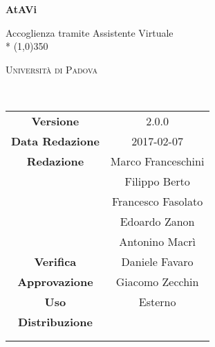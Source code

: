 \documentclass[a4paper,12pt]{article}
\date{2016-12-20}
\begin{document}
	\begin{titlepage}
		\centering
		{\huge\bfseries AtAVi\par}
		Accoglienza tramite Assistente Virtuale \\*
		\line(1,0){350} \\
		{\scshape\LARGE Università di Padova \par}
		\vspace{1cm}
		{\scshape\Large \analisideirequisitii\ \par}
		\logo
		\newpage
		\begin{tabular}{c|c}
			{\hfill \textbf{Versione}} 			& 2.0.0						\\ 
			{\hfill\textbf{Data Redazione}} 	& 2017-02-07 		\\ 
			{\hfill\textbf{Redazione}} 			& Marco Franceschini \\ & Filippo Berto \\ & Francesco Fasolato 	\\ & Edoardo Zanon \\ & Antonino Macrì		\\ 
			{\hfill\textbf{Verifica}} 			& Daniele Favaro \\ 
			{\hfill\textbf{Approvazione}} 		& Giacomo Zecchin		\\
			{\hfill\textbf{Uso}} 				& Esterno 				\\
			{\hfill\textbf{Distribuzione}} 		& \vardanega \\ & \cardin \\ & \prop \\
		\end{tabular}
	\end{titlepage}
	
	\pagestyle{myfront}
	\newpage
	
	\newpage
	\tableofcontents
	\newpage
	\listoftables
	\newpage
	\listoffigures
	
	\label{LastFrontPage}	
	\newpage	
	\pagestyle{mymain}
				
	\newpage	
		
	\newpage	
			
	\newpage	
		
		
	\label{LastPage}
\end{document}
